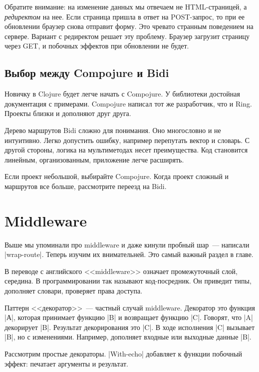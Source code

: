 Обратите внимание: на изменение данных мы отвечаем не HTML-страницей, а
\emph{редиректом} на нее. Если страница пришла в ответ на POST-запрос, то при ее
обновлении браузер снова отправит форму. Это чревато странным поведением на
сервере. Вариант с редиректом решает эту проблему. Браузер загрузит страницу
через GET, и побочных эффектов при обновлении не будет.

\subsection{Выбор между Compojure и Bidi}

Новичку в Clojure будет легче начать с Compojure. У библиотеки достойная
документация с примерами. Compojure написал тот же разработчик, что и
Ring. Проекты близки и дополняют друг друга.

Дерево маршрутов Bidi сложно для понимания. Оно многословно и не
интуитивно. Легко допустить ошибку, например перепутать вектор и словарь. С
другой стороны, логика на мультиметодах несет преимущества. Код становится
линейным, организованным, приложение легче расширять.

Если проект небольшой, выбирайте Compojure. Когда проект сложный и маршрутов все
больше, рассмотрите переезд на Bidi.

\section{Middleware}

Выше мы упоминали про middleware и даже кинули пробный шар~--- написали
\spverb|wrap-route|. Теперь изучим их внимательней. Это самый важный раздел в
главе.

В переводе с английского <<middleware>> означает промежуточный слой, середина. В
программировании так называют код-посредник. Он приведит типы, дополняет
словари, проверяет права доступа.

\label{decorator}

Паттерн <<декоратор>>~--- частный случай middleware. Декоратор это функция
\spverb|А|, которая принимает функцию \spverb|B| и возвращает функцию
\spverb|C|. Говорят, что \spverb|A| декорирует \spverb|B|. Результат
декорирования это \spverb|C|. В ходе исполнения \spverb|C| вызывает \spverb|B|,
но с изменениями. Например, дополняет входные или выходные данные \spverb|B|.

Рассмотрим простые декораторы. \spverb|With-echo| добавляет к функции побочный
эффект: печатает аргументы и результат.


